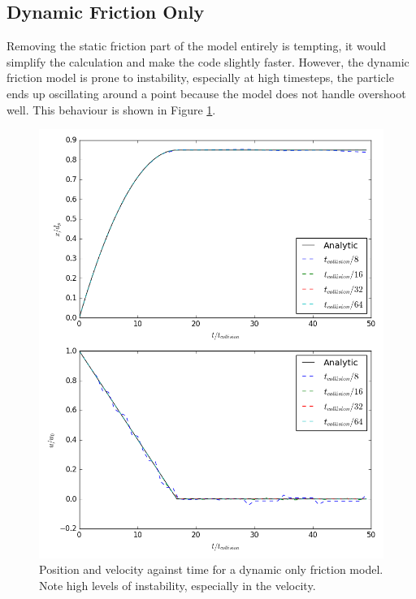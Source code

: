 \documentclass[10pt,a4paper,titlepage]{report}
\begin{document}
\subsection{Dynamic Friction Only}
Removing the static friction part of the model entirely is tempting, it would simplify the calculation and make the code slightly faster. However, the dynamic friction model is prone to instability, especially at high timesteps, the particle ends up oscillating around a point because the model does not handle overshoot well. This behaviour is shown in Figure \ref{fig:dynamic_only}.
\begin{figure}[!ht]
\centering
\includegraphics[scale=0.65]{figures/friction_model/dynamic_only.png}
\caption{Position and velocity against time for a dynamic only friction model. Note high levels of instability, especially in the velocity.}
\label{fig:dynamic_only}
\end{figure}
\end{document}
